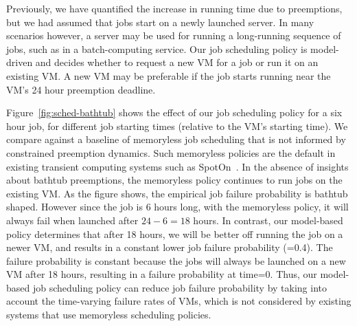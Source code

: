 Previously, we have quantified the increase in running time due to preemptions, but we had assumed that jobs start on a newly launched server.
In many scenarios however, a server may be used for running a long-running sequence of jobs, such as in a batch-computing service. 
%
Our job scheduling policy is model-driven and decides whether to request a new VM for a job or run it on an existing VM.
A new VM may be preferable if the job starts running near the VM's 24 hour preemption deadline.

Figure~\ref{fig:sched-bathtub} shows the effect of our job scheduling policy for a six hour job, for different job starting times (relative to the VM's starting time). 
We compare against a baseline of memoryless job scheduling that is not informed by constrained preemption dynamics.
Such memoryless policies are the default in existing transient computing systems such as SpotOn~\cite{spoton}. 
In the absence of insights about bathtub preemptions, the memoryless policy continues to run jobs on the existing VM. 
As the figure shows, the empirical job failure probability is bathtub shaped. 
However since the job is 6 hours long, with the memoryless policy, it will always fail when launched after $24-6=18$ hours.
In contrast, our model-based policy determines that after 18 hours, we will be better off running the job on a newer VM, and results in a constant lower job failure probability (=0.4). The failure probability is constant because the jobs will always be launched on a new VM after 18 hours, resulting in a failure probability at time=0. 
Thus, our model-based job scheduling policy can reduce job failure probability by taking into account the time-varying failure rates of VMs, which is not considered by existing systems that use memoryless scheduling policies. 





